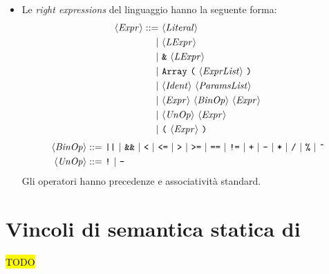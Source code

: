 \begin{itemize}
\item Le \emph{right expressions} del linguaggio hanno la seguente forma:
\begin{align*}
\langle \mathit{Expr} \rangle ::=\ &\langle \mathit{Literal} \rangle\\
|\ &\langle \mathit{LExpr} \rangle\\
|\ &\texttt{\&}\ \langle \mathit{LExpr} \rangle\\
|\ &\texttt{Array}\ \texttt{(}\ \langle \mathit{ExprList} \rangle\ \texttt{)}\\
|\ &\langle \mathit{Ident} \rangle\ \langle \mathit{ParamsList} \rangle\\
|\ &\langle \mathit{Expr} \rangle\ \langle \mathit{BinOp} \rangle\ \langle \mathit{Expr} \rangle\\
|\ &\langle \mathit{UnOp} \rangle\ \langle \mathit{Expr} \rangle\\
|\ &\texttt{(}\ \langle \mathit{Expr} \rangle\ \texttt{)}
\end{align*}
\begin{align*}
\token{BinOp} ::=\ 
&\texttt{||}\ |\ \texttt{\&\&}\ |\ \texttt{<}\ |\ \texttt{<=}\ |\ \texttt{>}\ |\ \texttt{>=}\ |\ \texttt{==}\ |\  \texttt{!=}\ 
|\ \texttt{+}\ |\ \texttt{-}\ |\ \texttt{*}\ |\ \texttt{/}\ |\ \texttt{\%}\ |\ \texttt{\^{}} \\
\token{UnOp} ::=\ &\texttt{!}\ |\ \texttt{-}
\end{align*}
Gli operatori hanno precedenze e associatività standard.

\end{itemize}

\section{Vincoli di semantica statica di \SBF}
\hl{TODO}